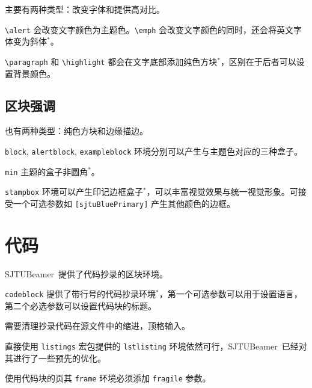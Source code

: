 \documentclass[
    UTF8,
    heading=true,
    12pt,
    a4paper
]{ctexrep}
\def\themename{\textsf{SJTUBeamer}}
\begin{document}
主要有两种类型：改变字体和提供高对比。


\begin{commentlist}
  \item \texttt{\textbackslash{}alert} 会改变文字颜色为主题色。\texttt{\textbackslash{}emph} 会改变文字颜色的同时，还会将英文字体变为斜体$^*$。
  \item \texttt{\textbackslash{}paragraph} 和 \texttt{\textbackslash{}highlight} 都会在文字底部添加纯色方块$^*$，区别在于后者可以设置背景颜色。
\end{commentlist}

\section{区块强调}

也有两种类型：纯色方块和边缘描边。



\begin{commentlist}
  \item \texttt{block}, \texttt{alertblock}, \texttt{exampleblock} 环境分别可以产生与主题色对应的三种盒子。
  \item \texttt{min} 主题的盒子非圆角$^*$。
  \item \texttt{stampbox} 环境可以产生印记边框盒子$^*$，可以丰富视觉效果与统一视觉形象。可接受一个可选参数如 \texttt{[sjtuBluePrimary]} 产生其他颜色的边框。
\end{commentlist}

\chapter{代码}

\themename\ 提供了代码抄录的区块环境。


\begin{commentlist}
  \item \texttt{codeblock} 提供了带行号的代码抄录环境$^*$，第一个可选参数可以用于设置语言，第二个必选参数可以设置代码块的标题。
  \item 需要清理抄录代码在源文件中的缩进，顶格输入。
  \item 直接使用 \texttt{listings} 宏包提供的 \texttt{lstlisting} 环境依然可行，\themename\ 已经对其进行了一些预先的优化。
  \item[\faExclamationTriangle] 使用代码块的页其 \texttt{frame} 环境必须添加 \texttt{fragile} 参数。
\end{commentlist}
\end{document}

